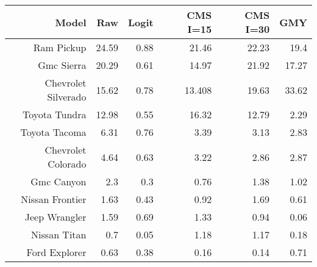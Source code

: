 \begin{tabular}{rrrrrr}
  \hline
  \textbf{Model} & \textbf{Raw} & \textbf{Logit} & \textbf{CMS I=15} & \textbf{CMS I=30} & \textbf{GMY} \\\hline
  Ram Pickup & 24.59 & 0.88 & 21.46 & 22.23 & 19.4 \\
  Gmc Sierra & 20.29 & 0.61 & 14.97 & 21.92 & 17.27 \\
  Chevrolet Silverado & 15.62 & 0.78 & 13.408 & 19.63 & 33.62 \\
  Toyota Tundra & 12.98 & 0.55 & 16.32 & 12.79 & 2.29 \\
  Toyota Tacoma & 6.31 & 0.76 & 3.39 & 3.13 & 2.83 \\
  Chevrolet Colorado & 4.64 & 0.63 & 3.22 & 2.86 & 2.87 \\
  Gmc Canyon & 2.3 & 0.3 & 0.76 & 1.38 & 1.02 \\
  Nissan Frontier & 1.63 & 0.43 & 0.92 & 1.69 & 0.61 \\
  Jeep Wrangler & 1.59 & 0.69 & 1.33 & 0.94 & 0.06 \\
  Nissan Titan & 0.7 & 0.05 & 1.18 & 1.17 & 0.18 \\
  Ford Explorer & 0.63 & 0.38 & 0.16 & 0.14 & 0.71 \\\hline
\end{tabular}
